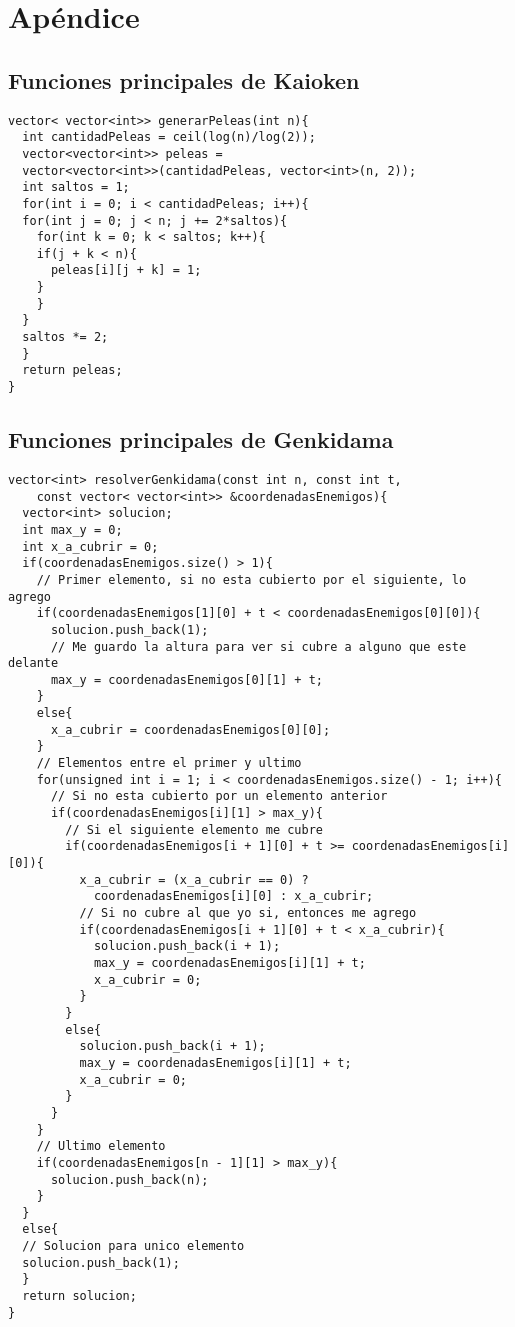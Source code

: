 \section{Apéndice}\label{sec:codigo}

\subsection{Funciones principales de Kaioken}
\begin{lstlisting}
vector< vector<int>> generarPeleas(int n){
  int cantidadPeleas = ceil(log(n)/log(2));
  vector<vector<int>> peleas = 
  vector<vector<int>>(cantidadPeleas, vector<int>(n, 2));
  int saltos = 1;
  for(int i = 0; i < cantidadPeleas; i++){
  for(int j = 0; j < n; j += 2*saltos){
    for(int k = 0; k < saltos; k++){
    if(j + k < n){
      peleas[i][j + k] = 1;
    }
    }
  }
  saltos *= 2;
  }
  return peleas;
}
\end{lstlisting}

\subsection{Funciones principales de Genkidama}
\begin{lstlisting}
vector<int> resolverGenkidama(const int n, const int t, 
	const vector< vector<int>> &coordenadasEnemigos){
  vector<int> solucion;
  int max_y = 0;
  int x_a_cubrir = 0;
  if(coordenadasEnemigos.size() > 1){
    // Primer elemento, si no esta cubierto por el siguiente, lo agrego
    if(coordenadasEnemigos[1][0] + t < coordenadasEnemigos[0][0]){
      solucion.push_back(1);
      // Me guardo la altura para ver si cubre a alguno que este delante
      max_y = coordenadasEnemigos[0][1] + t;
    }
    else{
      x_a_cubrir = coordenadasEnemigos[0][0];
    }
    // Elementos entre el primer y ultimo
    for(unsigned int i = 1; i < coordenadasEnemigos.size() - 1; i++){
      // Si no esta cubierto por un elemento anterior
      if(coordenadasEnemigos[i][1] > max_y){
        // Si el siguiente elemento me cubre
        if(coordenadasEnemigos[i + 1][0] + t >= coordenadasEnemigos[i][0]){
          x_a_cubrir = (x_a_cubrir == 0) ? 
            coordenadasEnemigos[i][0] : x_a_cubrir;
          // Si no cubre al que yo si, entonces me agrego
          if(coordenadasEnemigos[i + 1][0] + t < x_a_cubrir){
            solucion.push_back(i + 1);
            max_y = coordenadasEnemigos[i][1] + t;
            x_a_cubrir = 0;
          }
        }
        else{
          solucion.push_back(i + 1);
          max_y = coordenadasEnemigos[i][1] + t;
          x_a_cubrir = 0;
        }
      }
    }
    // Ultimo elemento
    if(coordenadasEnemigos[n - 1][1] > max_y){
      solucion.push_back(n);
    }
  }
  else{
  // Solucion para unico elemento
  solucion.push_back(1);
  }
  return solucion;
}
\end{lstlisting}

